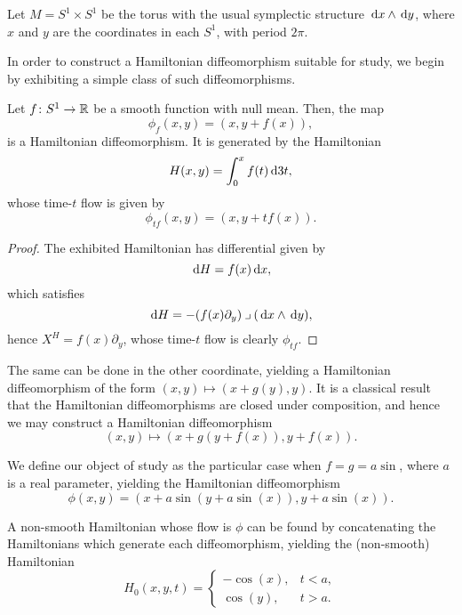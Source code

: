 Let $M = S^1 \times S^1$ be the torus with the usual symplectic structure $\dl x \wedge \dl y$, where $x$ and $y$ are the coordinates in each $S^1$, with period $2\pi$.

In order to construct a Hamiltonian diffeomorphism suitable for study, we begin by exhibiting a simple class of such diffeomorphisms.

\begin{lemma}
Let $f \colon S^1 \to \mathbb{R}$ be a smooth function with null mean. Then, the map
\begin{equation}
\phi_f(x,y) = (x, y + f(x)),
\end{equation}
is a Hamiltonian diffeomorphism. It is generated by the Hamiltonian
\begin{equation}
H(x,y) = \int_0^x f(t) \dl3 t,
\end{equation}
whose time-$t$ flow is given by
\begin{equation}
\phi_{tf}(x,y) = (x, y + t f(x)).
\end{equation}
\end{lemma}

\begin{proof}
The exhibited Hamiltonian has differential given by
\begin{equation}
\dl H = f(x) \dl x,
\end{equation}
which satisfies
\begin{equation}
\dl H = - (f(x) \partial_y) \into (\dl x \wedge \dl y),
\end{equation}
hence $X^H = f(x) \partial_y$, whose time-$t$ flow is clearly $\phi_{tf}$.
\end{proof}

The same can be done in the other coordinate, yielding a Hamiltonian diffeomorphism of the form $(x,y) \mapsto (x + g(y), y)$. It is a classical result that the Hamiltonian diffeomorphisms are closed under composition, and hence we may construct a Hamiltonian diffeomorphism
\begin{equation}
(x,y) \mapsto (x + g(y+f(x)), y+f(x)).
\end{equation}

We define our object of study as the particular case when $f = g = a \sin$, where $a$ is a real parameter, yielding the Hamiltonian diffeomorphism
\begin{equation}\label{eq:phi1def}
\phi(x,y) = ( x + a \sin(y + a \sin(x)), y + a \sin(x)).
\end{equation}

A non-smooth Hamiltonian whose flow is $\phi$ can be found by concatenating the Hamiltonians which generate each diffeomorphism, yielding the (non-smooth) Hamiltonian
\begin{equation}
H_0(x,y,t) = \begin{cases}
-\cos(x), & t < a,\\
\cos(y), & t > a.
\end{cases}
\end{equation}


